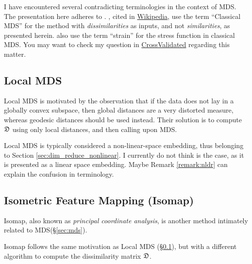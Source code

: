 \begin{remark}
I have encountered several contradicting terminologies in the context of MDS.
The presentation here adheres to \cite{hastie_elements_2003}. \cite{borg_modern_2005}, cited in  \href{http://en.wikipedia.org/wiki/Multidimensional_scaling}{Wikipedia}, use the term ``Classical MDS'' for the method with \emph{dissimilarities} as inputs, and not \emph{similarities}, as presented herein.
\cite{borg_modern_2005} also use the term ``strain'' for the stress function in classical MDS.
You may want to check my question in \href{http://stats.stackexchange.com/questions/148137/similarities-and-dissimilarities-in-multidimensional-scaling}{CrossValidated} regarding this matter.
\end{remark}




\subsection{Local MDS}
\label{sec:localMDS}
Local MDS is motivated by the observation that if the data does not lay in a globally convex subspace, then global distances are a very distorted measure, whereas geodesic distances should be used instead. 
Their solution is to compute $\mathfrak{D}$ using only local distances, and then calling upon MDS.

\begin{remark}
\label{remark:linearity_of_localMDS}
Local MDS is typically considered a non-linear-space embedding, thus belonging to Section \ref{sec:dim_reduce_nonlinear}.
I currently do not think is the case, as it is presented as a linear space embedding.
Maybe Remark \ref{remark:nldr} can explain the confusion in terminology.
\end{remark}



\subsection{Isometric Feature Mapping (Isomap)}
\label{sec:isomap}

Isomap, also known as \emph{principal coordinate analysis}, is another method intimately related to MDS(\S\ref{sec:mds}).

Isomap follows the same motivation as Local MDS (\S\ref{sec:localMDS}), but with a different algorithm to compute the dissimilarity matrix $\mathfrak{D}$.

